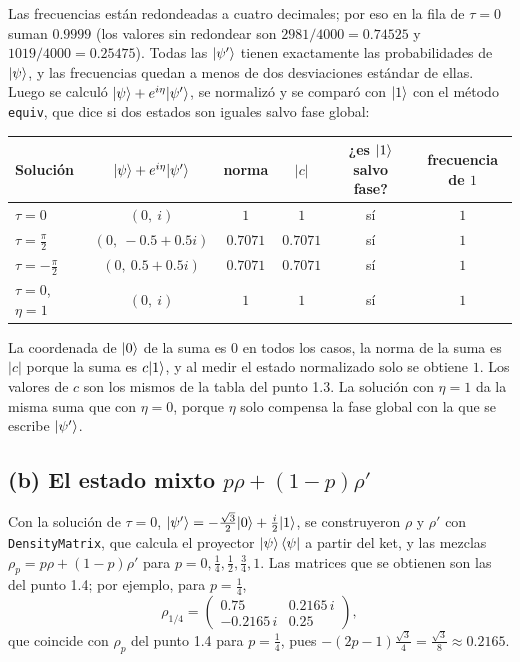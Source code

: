 Las frecuencias están redondeadas a cuatro decimales; por eso en la fila de $\tau=0$ suman
$0.9999$ (los valores sin redondear son $2981/4000=0.74525$ y $1019/4000=0.25475$). Todas las
$\lvert \psi'\rangle$ tienen exactamente las probabilidades de $\lvert \psi\rangle$, y las frecuencias quedan a
menos de dos desviaciones estándar de ellas. Luego se calculó
$\lvert \psi\rangle+e^{i\eta}\lvert \psi'\rangle$, se normalizó y se comparó con $\lvert 1\rangle$ con el método
\texttt{equiv}, que dice si dos estados son iguales salvo fase global:

\begin{center}
\renewcommand{\arraystretch}{1.3}
\begin{tabular}{lccccc}
  Solución & $\lvert \psi\rangle+e^{i\eta}\lvert \psi'\rangle$ & norma & $|c|$ & ¿es $\lvert 1\rangle$ salvo fase? & frecuencia de $1$\\\hline
  $\tau=0$ & $(0,\ i)$ & $1$ & $1$ & sí & $1$\\
  $\tau=\frac\pi2$ & $(0,\ -0.5+0.5i)$ & $0.7071$ & $0.7071$ & sí & $1$\\
  $\tau=-\frac\pi2$ & $(0,\ 0.5+0.5i)$ & $0.7071$ & $0.7071$ & sí & $1$\\
  $\tau=0$, $\eta=1$ & $(0,\ i)$ & $1$ & $1$ & sí & $1$
\end{tabular}
\end{center}

La coordenada de $\lvert 0\rangle$ de la suma es $0$ en todos los casos, la norma de la suma es $|c|$
porque la suma es $c\lvert 1\rangle$, y al medir el estado normalizado solo se obtiene $1$. Los valores de
$c$ son los mismos de la tabla del punto 1.3. La solución con $\eta=1$ da la misma suma que con
$\eta=0$, porque $\eta$ solo compensa la fase global con la que se escribe $\lvert \psi'\rangle$.

\subsection*{(b) El estado mixto $p\rho+(1-p)\rho'$}

Con la solución de $\tau=0$, $\lvert \psi'\rangle=-\frac{\sqrt3}{2}\lvert 0\rangle+\frac{i}{2}\lvert 1\rangle$, se construyeron
$\rho$ y $\rho'$ con \texttt{DensityMatrix}, que calcula el proyector $\lvert \psi\rangle\bra\psi$ a partir
del ket, y las mezclas $\rho_p=p\rho+(1-p)\rho'$ para $p=0,\frac14,\frac12,\frac34,1$. Las matrices
que se obtienen son las del punto 1.4; por ejemplo, para $p=\frac14$,
\[
  \rho_{1/4}=\begin{pmatrix}0.75 & 0.2165\,i\\ -0.2165\,i & 0.25\end{pmatrix},
\]
que coincide con $\rho_p$ del punto 1.4 para $p=\frac14$, pues
$-(2p-1)\frac{\sqrt3}{4}=\frac{\sqrt3}{8}\approx0.2165$.

